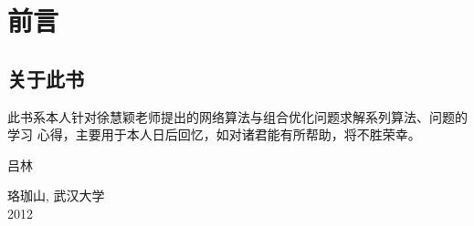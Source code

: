 

\chapter*{前言}

% 
% 
\section*{关于此书}

此书系本人针对徐慧颖老师提出的网络算法与组合优化问题求解系列算法、问题的学习
心得，主要用于本人日后回忆，如对诸君能有所帮助，将不胜荣幸。

\begin{flushright}
\vspace{1in}
吕林
\end{flushright}

\begin{flushleft}
\vspace{0.2in}
珞珈山, 武汉大学 \\
2012
\end{flushleft}
